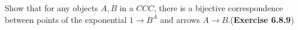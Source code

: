 Show that for any objects $A, B$ in a $CCC$, there is a bijective correspondence between points of the exponential $1 \to B^A$ and arrows $A \to B$.(\textbf{Exercise 6.8.9})